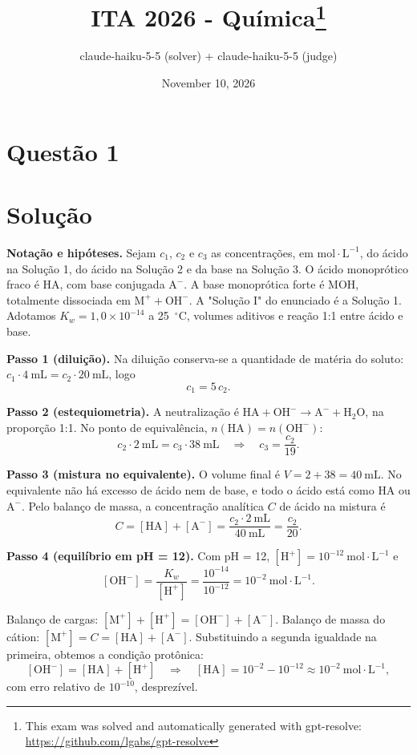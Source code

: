 \documentclass{article}%
\title{ITA 2026 - Química\thanks{This exam was solved and automatically generated with gpt-resolve: \url{https://github.com/lgabs/gpt-resolve}}}%
\author{claude{-}haiku{-}5{-}5 (solver) + claude{-}haiku{-}5{-}5 (judge)}%
\date{November 10, 2026}%
\begin{document}
%
\normalsize%
\maketitle%
\section*{Questão 1}

\section*{Solução}

\textbf{Notação e hipóteses.} Sejam $c_1$, $c_2$ e $c_3$ as concentrações, em $\text{mol}\cdot\text{L}^{-1}$, do ácido na Solução 1, do ácido na Solução 2 e da base na Solução 3. O ácido monoprótico fraco é $\text{HA}$, com base conjugada $\text{A}^-$. A base monoprótica forte é $\text{MOH}$, totalmente dissociada em $\text{M}^+ + \text{OH}^-$. A "Solução I" do enunciado é a Solução 1. Adotamos $K_w = 1{,}0\times10^{-14}$ a 25~$^{\circ}$C, volumes aditivos e reação 1:1 entre ácido e base.

\textbf{Passo 1 (diluição).} Na diluição conserva-se a quantidade de matéria do soluto: $c_1 \cdot 4\ \text{mL} = c_2 \cdot 20\ \text{mL}$, logo
\[
c_1 = 5\,c_2 .
\]

\textbf{Passo 2 (estequiometria).} A neutralização é $\text{HA} + \text{OH}^- \rightarrow \text{A}^- + \text{H}_2\text{O}$, na proporção 1:1. No ponto de equivalência, $n(\text{HA}) = n(\text{OH}^-)$:
\[
c_2 \cdot 2\ \text{mL} = c_3 \cdot 38\ \text{mL} \quad\Rightarrow\quad c_3 = \frac{c_2}{19}.
\]

\textbf{Passo 3 (mistura no equivalente).} O volume final é $V = 2 + 38 = 40\ \text{mL}$. No equivalente não há excesso de ácido nem de base, e todo o ácido está como $\text{HA}$ ou $\text{A}^-$. Pelo balanço de massa, a concentração analítica $C$ de ácido na mistura é
\[
C = [\text{HA}] + [\text{A}^-] = \frac{c_2 \cdot 2\ \text{mL}}{40\ \text{mL}} = \frac{c_2}{20}.
\]

\textbf{Passo 4 (equilíbrio em pH = 12).} Com pH = 12, $[\text{H}^+] = 10^{-12}\ \text{mol}\cdot\text{L}^{-1}$ e
\[
[\text{OH}^-] = \frac{K_w}{[\text{H}^+]} = \frac{10^{-14}}{10^{-12}} = 10^{-2}\ \text{mol}\cdot\text{L}^{-1}.
\]

Balanço de cargas: $[\text{M}^+] + [\text{H}^+] = [\text{OH}^-] + [\text{A}^-]$. Balanço de massa do cátion: $[\text{M}^+] = C = [\text{HA}] + [\text{A}^-]$. Substituindo a segunda igualdade na primeira, obtemos a condição protônica:
\[
[\text{OH}^-] = [\text{HA}] + [\text{H}^+] \quad\Rightarrow\quad [\text{HA}] = 10^{-2} - 10^{-12} \approx 10^{-2}\ \text{mol}\cdot\text{L}^{-1},
\]
com erro relativo de $10^{-10}$, desprezível.
\end{document}
